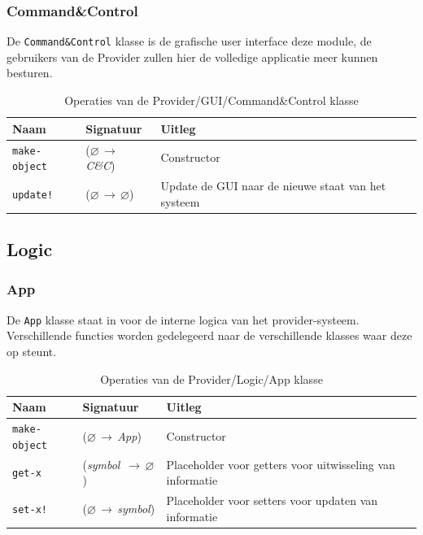 \documentclass[a4paper, 11pt]{article}
\newcommand{\naar}{\,$\rightarrow$\,}
\renewcommand{\empty}{$\varnothing$}
\newcommand{\<}{\scriptsize\textless\normalsize}
\renewcommand{\>}{\scriptsize\textgreater\normalsize}
\begin{document}
\subsubsection{Command\&Control} %
De \texttt{Command\&Control} klasse is de grafische user interface deze module, de gebruikers van de Provider zullen hier de volledige applicatie meer kunnen besturen.
\begin{table}[H]
	\begin{center}
		\begin{tabular}{|l l l|}
			\hline
			\textbf{Naam} & \textbf{Signatuur} & \textbf{Uitleg}\\
			\hline
			\texttt{make-object} & (\empty \naar \textit{C\&C}) & Constructor\\\hline
			\texttt{update!} & (\empty \naar \empty) & Update de GUI naar de nieuwe staat van het systeem\\
			\hline
		\end{tabular}
		\caption{Operaties van de Provider/GUI/Command\&Control klasse}
	\end{center}
\end{table}

\newpage

\subsection{Logic} %

\subsubsection{App} %
De \texttt{App} klasse staat in voor de interne logica van het provider-systeem. Verschillende functies worden gedelegeerd naar de verschillende klasses waar deze op steunt.
\begin{table}[H]
	\begin{center}
		\begin{tabular}{|l l l|}
			\hline
			\textbf{Naam} & \textbf{Signatuur} & \textbf{Uitleg}\\
			\hline
			\texttt{make-object} & (\empty \naar \textit{App}) & Constructor\\
			\hline
			\texttt{get-x} & (\textit{symbol} \naar \empty) & Placeholder voor getters voor uitwisseling van informatie\\
			\texttt{set-x!} & (\empty \naar \textit{symbol}) & Placeholder voor setters voor updaten van informatie\\
			\hline
		\end{tabular}
		\caption{Operaties van de Provider/Logic/App klasse}
	\end{center}
\end{table}
\end{document}
